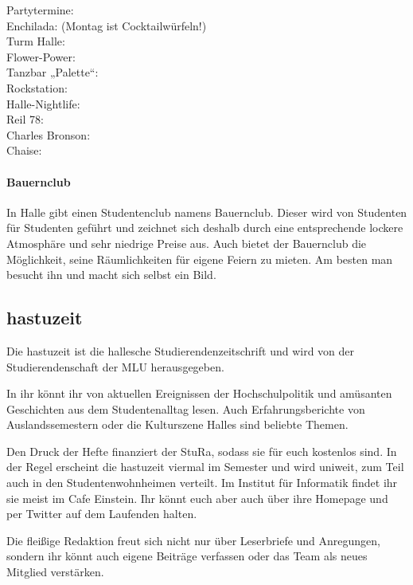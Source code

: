 Partytermine:  \\
Enchilada:  (Montag ist Cocktailwürfeln!)\\
Turm Halle:  \\
Flower-Power:  \\
Tanzbar „Palette“:  \\
Rockstation:  \\
Halle-Nightlife: \\
Reil 78:  \\
Charles Bronson: \\
Chaise: 

\paragraph{Bauernclub}
In Halle gibt einen Studentenclub namens Bauernclub.
Dieser wird von Studenten für Studenten geführt und zeichnet sich deshalb durch eine entsprechende lockere Atmosphäre und sehr niedrige Preise aus.
Auch bietet der Bauernclub die Möglichkeit, seine Räumlichkeiten für eigene Feiern zu mieten.
Am besten man besucht ihn und macht sich selbst ein Bild.

        
\subsection{hastuzeit}
Die hastuzeit ist die hallesche Studierendenzeitschrift und wird von der Studierendenschaft der MLU herausgegeben.

In ihr könnt ihr von aktuellen Ereignissen der Hochschulpolitik und amüsanten Geschichten aus dem Studentenalltag lesen.
Auch Erfahrungsberichte von Auslandssemestern oder die Kulturszene Halles sind beliebte Themen.

Den Druck der Hefte finanziert der StuRa, sodass sie für euch kostenlos sind.
In der Regel erscheint die hastuzeit viermal im Semester und wird uniweit, zum Teil auch in den Studentenwohnheimen verteilt.
Im Institut für Informatik findet ihr sie meist im Cafe Einstein.
Ihr könnt euch aber auch über ihre Homepage und per Twitter auf dem Laufenden halten.

Die fleißige Redaktion freut sich nicht nur über Leserbriefe und Anregungen, sondern ihr könnt auch eigene Beiträge verfassen oder das Team als neues Mitglied verstärken.

\\
\\



